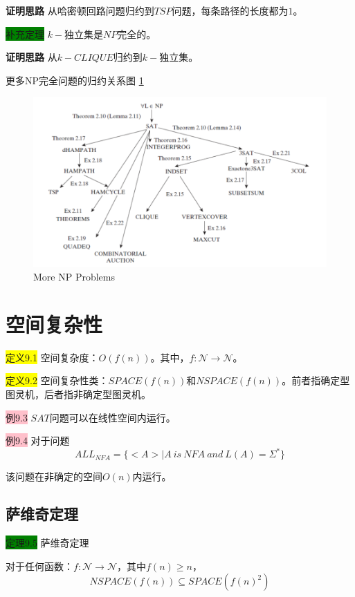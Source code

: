 \documentclass[a4paper]{article}
\begin{document}
	\textbf{证明思路} \quad 从哈密顿回路问题归约到$TSP$问题，每条路径的长度都为$1$。
	
	\colorbox{green}{补充定理} $k-\text{独立集}$是$NP$完全的。
	
	\textbf{证明思路} \quad 从$k-CLIQUE$归约到$k-\text{独立集}$。

	更多NP完全问题的归约关系图 \ref{F080504}
	\begin{figure}[htb]
		\centering
		\includegraphics[scale=0.6]{./figure/8.5.4.png}
		\caption{More NP Problems}
		\label{F080504}
   \end{figure} 

	
	
\section{空间复杂性}

	\colorbox{yellow}{定义9.1} 空间复杂度：$O(f(n))$。其中，$f: \mathcal{N} \rightarrow \mathcal{N}$。

	\colorbox{yellow}{定义9.2} 空间复杂性类：$SPACE(f(n))$和$NSPACE(f(n))$。前者指确定型图灵机，后者指非确定型图灵机。
	
	\colorbox{pink}{例9.3} $SAT$问题可以在线性空间内运行。
	
	\colorbox{pink}{例9.4} 对于问题
		$$ALL_{NFA}=\{<A>|A~is~NFA~and~L(A)=\Sigma^*\}$$

		该问题在非确定的空间$O(n)$内运行。
	
\subsection{萨维奇定理}

	\colorbox{green}{定理9.5} 萨维奇定理

		对于任何函数：$f: \mathcal{N} \rightarrow \mathcal{N}$，其中$f(n)\geq n$，
			$$NSPACE(f(n))\subseteq SPACE(f(n)^2)$$
\end{document}
